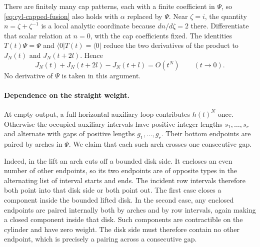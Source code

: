 There are finitely many cap patterns, each with a finite coefficient
in \(\Psi\), so \eqref{eq:cyl-capped-fusion} also holds with
\(\alpha\) replaced by \(\Psi\).  Near \(\zeta=i\), the quantity
\(n=\zeta+\zeta^{-1}\) is a local analytic coordinate because
\(dn/d\zeta=2\) there.  Differentiate that scalar relation at \(n=0\),
with the cap coefficients fixed.  The identities
\(T(t)\Psi=\Psi\) and \(\langle0|T(t)=\langle0|\) reduce the two
derivatives of the product to \(J_N(t)\) and \(J_N(t+2l)\).  Hence
\begin{equation}\label{eq:cyl-differentiated-fusion}
 J_N(t)+J_N(t+2l)-J_N(t+l)=O(t^N)
 \qquad(t\to0).
\end{equation}
No derivative of \(\Psi\) is taken in this argument.

\paragraph{Dependence on the straight weight.}
At empty output, a full horizontal auxiliary loop contributes
\(h(t)^N\) once.  Otherwise the occupied auxiliary intervals have
positive integer lengths \(s_1,\ldots,s_r\) and alternate with gaps
of positive lengths \(g_1,\ldots,g_r\).  Their bottom endpoints are
paired by arches in \(\Psi\).  We claim that each such arch crosses
one consecutive gap.

Indeed, in the lift an arch cuts off a bounded disk side.  It encloses
an even number of other endpoints, so its two endpoints are of
opposite types in the alternating list of interval starts and ends.
The incident row intervals therefore both point into that disk side
or both point out.  The first case closes a component inside the
bounded lifted disk.  In the second case, any enclosed endpoints are
paired internally both by arches and by row intervals, again making
a closed component inside that disk.  Such components are
contractible on the cylinder and have zero weight.  The disk side must
therefore contain no other endpoint, which is precisely a pairing
across a consecutive gap.

